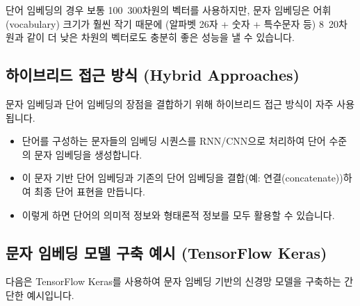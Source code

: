 \documentclass[11pt,a4paper]{article}
\theoremstyle{definition}
\begin{document}
\begin{infobox}
단어 임베딩의 경우 보통 100~300차원의 벡터를 사용하지만, 문자 임베딩은 어휘(vocabulary) 크기가 훨씬 작기 때문에 (알파벳 26자 + 숫자 + 특수문자 등) 8~20차원과 같이 더 낮은 차원의 벡터로도 충분히 좋은 성능을 낼 수 있습니다.
\end{infobox}

\subsection{하이브리드 접근 방식 (Hybrid Approaches)}
문자 임베딩과 단어 임베딩의 장점을 결합하기 위해 하이브리드 접근 방식이 자주 사용됩니다.
\begin{itemize}
    \item 단어를 구성하는 문자들의 임베딩 시퀀스를 RNN/CNN으로 처리하여 단어 수준의 문자 임베딩을 생성합니다.
    \item 이 문자 기반 단어 임베딩과 기존의 단어 임베딩을 결합(예: 연결(concatenate))하여 최종 단어 표현을 만듭니다.
    \item 이렇게 하면 단어의 의미적 정보와 형태론적 정보를 모두 활용할 수 있습니다.
\end{itemize}

\subsection{문자 임베딩 모델 구축 예시 (TensorFlow Keras)}
다음은 TensorFlow Keras를 사용하여 문자 임베딩 기반의 신경망 모델을 구축하는 간단한 예시입니다.
\end{document}
